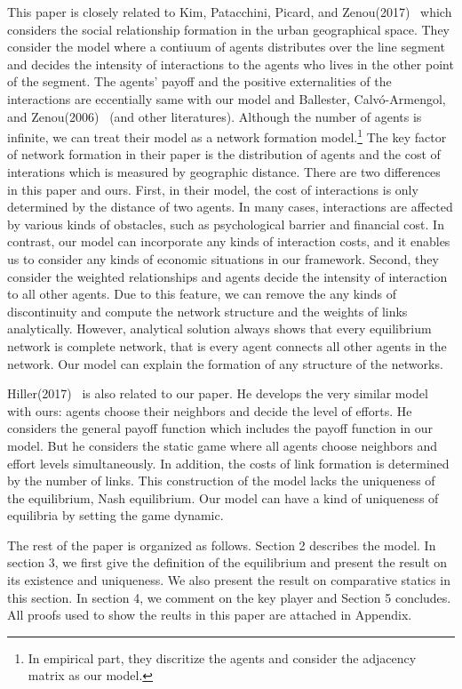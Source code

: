 \documentclass[12pt]{article}
\theoremstyle{definition}
\begin{document}
This paper is closely related to Kim, Patacchini, Picard, and Zenou(2017)~\cite{Urban} which considers the social relationship formation in the urban geographical space.
They consider the model where a contiuum of agents distributes over the line segment and decides the intensity of interactions to the agents who lives in the other point of the segment.
The agents' payoff and the positive externalities of the interactions are eccentially same with our model and Ballester, Calv\'{o}-Armengol, and Zenou(2006)~\cite{whowho} (and other literatures).
Although the number of agents is infinite, we can treat their model as a network formation model.\footnote{In empirical part, they discritize the agents and consider the adjacency matrix as our model.}
The key factor of network formation in their paper is the distribution of agents and the cost of interations which is measured by geographic distance.
There are two differences in this paper and ours.
First, in their model, the cost of interactions is only determined by the distance of two agents.
In many cases, interactions are affected by various kinds of obstacles, such as psychological barrier and financial cost.
In contrast, our model can incorporate any kinds of interaction costs, and it enables us to consider any kinds of economic situations in our framework.
Second, they consider the weighted relationships and agents decide the intensity of interaction to all other agents.
Due to this feature, we can remove the any kinds of discontinuity and compute the network structure and the weights of links analytically.
However, analytical solution always shows that every equilibrium network is complete network, that is every agent connects all other agents in the network.
Our model can explain the formation of any structure of the networks.

Hiller(2017)~\cite{hiller} is also related to our paper.
He develops the very similar model with ours: agents choose their neighbors and decide the level of efforts.
He considers the general payoff function which includes the payoff function in our model.
But he considers the static game where all agents choose neighbors and effort levels simultaneously.
In addition, the costs of link formation is determined by the number of links.
This construction of the model lacks the uniqueness of the equilibrium, Nash equilibrium.
Our model can have a kind of uniqueness of equilibria by setting the game dynamic.

The rest of the paper is organized as follows.
Section 2 describes the model.
In section 3, we first give the definition of the equilibrium and present the result on its existence and uniqueness.
We also present the result on comparative statics in this section.
In section 4, we comment on the key player and Section 5 concludes.
All proofs used to show the reults in this paper are attached in Appendix.
\end{document}
